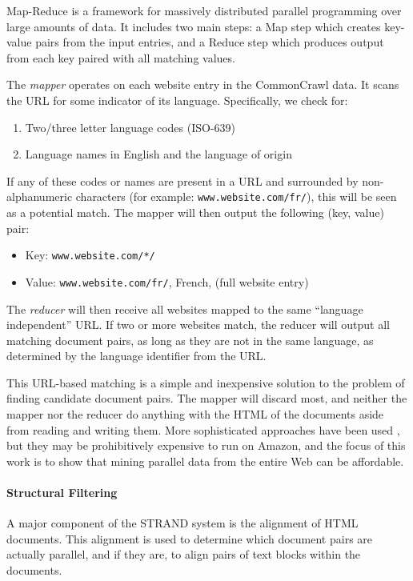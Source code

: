 Map-Reduce \citep{Dean04} is a framework for massively distributed parallel
programming over large amounts of data. It includes two main steps: a Map step
which creates key-value pairs from the input entries, and a Reduce step which
produces output from each key paired with all matching values.

The {\em mapper} operates on each website entry in the CommonCrawl data. It
scans the URL for some indicator of its language. Specifically, we check for:

\begin{enumerate}
\item Two/three letter language codes (ISO-639)
\item Language names in English and the language of origin
\end{enumerate}

If any of these codes or names are present in a URL and surrounded by non-alphanumeric
characters (for example: {\tt www.website.com/fr/}), this will be seen as a
potential match. The mapper will then output the following (key, value) pair:

\begin{itemize}
\item Key: {\tt www.website.com/*/}
\item Value: {\tt www.website.com/fr/}, French, (full website entry)
\end{itemize}


The {\em reducer} will then receive all websites mapped to the same
``language independent'' URL. If two or more websites match, the reducer will
output all matching document pairs, as long as they are not in the same
language, as determined by the language identifier from the URL.

This URL-based matching is a simple and inexpensive solution to the problem of
finding candidate document pairs. The mapper will discard most, and neither the
mapper nor the reducer do anything with the HTML of the documents aside from
reading and writing them. More sophisticated approaches have been used
\citep{Uszkoreit10,Ture12}, but they may be prohibitively expensive to run on
Amazon, and the focus of this work is to show that mining parallel data from the
entire Web can be affordable.  

\paragraph{Structural Filtering}
A major component of the STRAND system is the alignment of HTML documents. This
alignment is used to determine which document pairs are actually parallel, and
if they are, to align pairs of text blocks within the documents.

